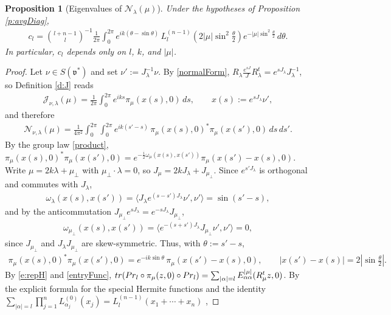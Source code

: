 \documentclass[11pt]{amsart}
\theoremstyle{plain}
\newtheorem{proposition}[theorem]{Proposition}
\theoremstyle{definition}
\theoremstyle{remark}
\numberwithin{equation}{section}
\def\fv{\mathfrak{v}}
\def\cN{\mathcal{N}}
\def\cJ{\mathcal{J}}
\numberwithin{equation}{section}
\begin{document}
\begin{proposition}[Eigenvalues of $\cN_\lambda(\mu)$]\label{p:avgEval}
	Under the hypotheses of Proposition \ref{p:avgDiag},
	\begin{align}\label{e:avgEval}
		c_l=\binom{l+n-1}{l}^{-1}\frac{1}{2\pi}\int_0^{2\pi}e^{ik(\theta-\sin\theta)}\,L_l^{(n-1)}\!\left(2|\mu|\sin^2\tfrac{\theta}{2}\right)e^{-|\mu|\sin^2\frac{\theta}{2}}\,d\theta.
	\end{align}
	In particular, $c_l$ depends only on $l$, $k$, and $|\mu|$.
\end{proposition}
\begin{proof}
	Let $\nu\in S(\fv^*)$ and set $\nu':=J_\lambda^{-1}\nu$. By \eqref{normalForm}, $R_\lambda \frac{e^{sJ}}{J}R_\lambda^t=e^{sJ_\lambda}J_\lambda^{-1}$, so Definition \ref{d:J} reads
	\begin{align*}
		\cJ_{\nu, \lambda}(\mu)=\frac{1}{2\pi}\int_0^{2\pi}e^{iks}\pi_\mu(x(s), 0)\,ds, \qquad x(s):=e^{sJ_\lambda}\nu',
	\end{align*}
	and therefore
	\begin{align*}
		\cN_{\nu, \lambda}(\mu)=\frac{1}{4\pi^2}\int_0^{2\pi}\!\!\int_0^{2\pi}e^{ik(s'-s)}\,\pi_\mu(x(s), 0)^*\pi_\mu(x(s'), 0)\,ds\,ds'.
	\end{align*}
	By the group law \eqref{product}, $\pi_\mu(x(s), 0)^*\pi_\mu(x(s'), 0)=e^{-\frac{i}{2}\omega_\mu(x(s), x(s'))}\pi_\mu(x(s')-x(s), 0)$. Write $\mu=2k\lambda+\mu_\perp$ with $\mu_\perp\cdot\lambda=0$, so $J_\mu=2kJ_\lambda+J_{\mu_\perp}$. Since $e^{s'J_\lambda}$ is orthogonal and commutes with $J_\lambda$,
	\begin{align*}
		\omega_\lambda(x(s), x(s'))=\langle J_\lambda e^{(s-s')J_\lambda}\nu', \nu'\rangle=\sin(s'-s),
	\end{align*}
	and by the anticommutation $J_{\mu_\perp}e^{sJ_\lambda}=e^{-sJ_\lambda}J_{\mu_\perp}$,
	\begin{align*}
		\omega_{\mu_\perp}(x(s), x(s'))=\langle e^{-(s+s')J_\lambda}J_{\mu_\perp}\nu', \nu'\rangle=0,
	\end{align*}
	since $J_{\mu_\perp}$ and $J_\lambda J_{\mu_\perp}$ are skew-symmetric. Thus, with $\theta:=s'-s$,
	\begin{align*}
		\pi_\mu(x(s), 0)^*\pi_\mu(x(s'), 0)=e^{-ik\sin\theta}\,\pi_\mu(x(s')-x(s), 0), \qquad |x(s')-x(s)|=2\left|\sin\tfrac{\theta}{2}\right|.
	\end{align*}
	By \eqref{e:repH} and \eqref{entryFunc}, ${\rm tr}({\rm Pr}_l\circ\pi_\mu(z, 0)\circ{\rm Pr}_l)=\sum_{|\alpha|=l}E^{|\mu|}_{\alpha\alpha}(R_\mu^tz, 0)$. By the explicit formula for the special Hermite functions and the identity $\sum_{|\alpha|=l}\prod_{j=1}^nL^{(0)}_{\alpha_j}(x_j)=L^{(n-1)}_l(x_1+\cdots+x_n)$ \cite{thangaveluHarmonicAnalysisHeisenberg1998},

\end{proof}
\end{document}
